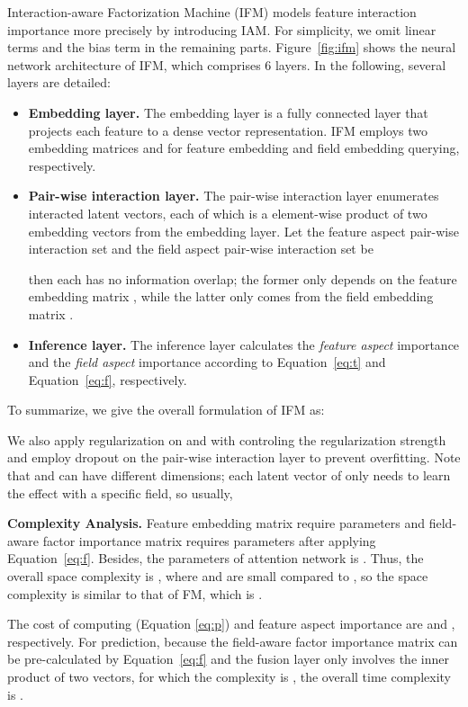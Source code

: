 \documentclass[letterpaper]{article} \usepackage{aaai19}  \usepackage{times}  \usepackage{helvet}  \usepackage{courier}  \usepackage{url}  \usepackage{graphicx}  \frenchspacing  \setlength{\pdfpagewidth}{8.5in}  \setlength{\pdfpageheight}{11in}  \usepackage{mathtools}
\begin{document}
Interaction-aware Factorization Machine (IFM) models feature interaction importance more precisely by introducing IAM. For simplicity, we omit linear terms and the bias term in the remaining parts. Figure~\ref{fig:ifm} shows the neural network architecture of IFM, which comprises 6 layers. In the following, several layers are detailed:
\begin{itemize}
\item \textbf{Embedding layer.} The embedding layer is a fully connected layer that projects each feature to a dense vector representation. IFM employs two embedding matrices  and  for feature embedding and field embedding querying, respectively.

\item \textbf{Pair-wise interaction layer.} The pair-wise interaction layer enumerates interacted latent vectors, each of which is a element-wise product of two embedding vectors from the embedding layer. Let the feature aspect pair-wise interaction set  and the field aspect pair-wise interaction set  be

then each has no information overlap; the former only depends on the feature embedding matrix , while the latter only comes from the field embedding matrix .
\item \textbf{Inference layer.} The inference layer calculates the \emph{feature aspect} importance and the \emph{field aspect} importance according to Equation~\ref{eq:t} and Equation~\ref{eq:f}, respectively.
\end{itemize}
To summarize, we give the overall formulation of IFM as:

We also apply  regularization on  and  with  controling the regularization strength and employ dropout\cite{srivastava2014dropout} on the pair-wise interaction layer to prevent overfitting. Note that  and  can have different dimensions; each latent vector of  only needs to learn the effect with a specific field, so usually,


\textbf{Complexity Analysis.} Feature embedding matrix  require  parameters and field-aware factor importance matrix  requires  parameters after applying Equation~\ref{eq:f}. Besides, the parameters of attention network is . Thus, the overall space complexity is , where  and  are small compared to , so the space complexity is similar to that of FM, which is .

The cost of computing  (Equation \ref{eq:p}) and feature aspect importance are  and , respectively. For prediction, because the field-aware factor importance matrix  can be pre-calculated by Equation~\ref{eq:f} and the fusion layer only involves the inner product of two vectors, for which the complexity is , the overall time complexity is . 
\end{document}
